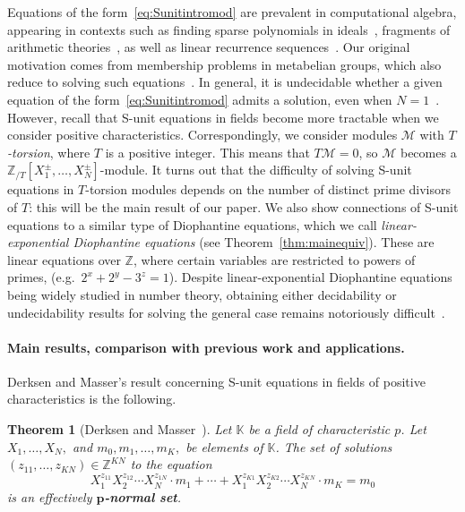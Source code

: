 \documentclass[letterpaper, 11pt, thm-restate]{article}
\numberwithin{equation}{section}
\newcommand{\Z}{\mathbb{Z}}
\newcommand{\K}{\mathbb{K}}
\newcommand{\ZT}{\mathbb{Z}_{/T}}
\newcommand{\mM}{\mathcal{M}}
\newcommand{\red}{\textcolor{red}}
\newtheorem{thrm}{Theorem}[section]
\theoremstyle{definition}
\theoremstyle{definition}
\theoremstyle{definition}
\begin{document}
Equations of the form~\eqref{eq:Sunitintromod} are prevalent in computational algebra, appearing in contexts such as finding sparse polynomials in ideals~\cite{jensen2017finding, draisma2023no}, fragments of arithmetic theories~\cite{Hieronymi2022}, as well as linear recurrence sequences~\cite{chonev2013orbit, ibrahim2024positivity}.
Our original motivation comes from membership problems in metabelian groups, which also reduce to solving such equations~\cite{figelius2020complexity, dong2024submonoid}.
In general, it is undecidable whether a given equation of the form~\eqref{eq:Sunitintromod} admits a solution, even when $N = 1$~\cite{Dong2025LinearEW}.
However, recall that S-unit equations in fields become more tractable when we consider positive characteristics.
Correspondingly, we consider modules $\mM$ with \emph{$T$-torsion}, where $T$ is a positive integer.
This means that $T \mM = 0$, so $\mM$ becomes a $\ZT[X_1^{\pm}, \ldots, X_N^{\pm}]$-module.
It turns out that the difficulty of solving S-unit equations in $T$-torsion modules depends on the number of distinct prime divisors of $T$: this will be the main result of our paper.
We also show connections of S-unit equations to a similar type of Diophantine equations, which we call \emph{linear-exponential Diophantine equations} (see Theorem~\ref{thm:mainequiv}).
These are linear equations over $\Z$, where certain variables are restricted to powers of primes, (e.g.\ $2^x + 2^y - 3^z = 1$).
Despite linear-exponential Diophantine equations being widely studied in number theory, obtaining either decidability or undecidability results for solving the general case remains notoriously difficult~\cite{Hieronymi2022, karimov2025decidability}.

\paragraph*{Main results, comparison with previous work and applications.}

Derksen and Masser's result concerning S-unit equations in fields of positive characteristics is the following.


\begin{thrm}[{Derksen and Masser~\cite{derksen2012linear}}]\label{thm:DM}
    Let $\K$ be a field of characteristic $p$. Let $X_1, \ldots, X_N,$ and $m_0, m_1, \ldots, m_K,$ be elements of $\K$.
    The set of solutions $(z_{11}, \ldots, z_{KN}) \in \Z^{KN}$ to the equation
    \[
        X_1^{z_{11}} X_2^{z_{12}} \cdots X_N^{z_{1N}} \cdot m_1 + \cdots + X_1^{z_{K1}} X_2^{z_{K2}} \cdots X_N^{z_{KN}} \cdot m_K = m_0
    \]
    is an effectively \textbf{$\boldsymbol{p}$-normal set}.
\end{thrm}
\end{document}
